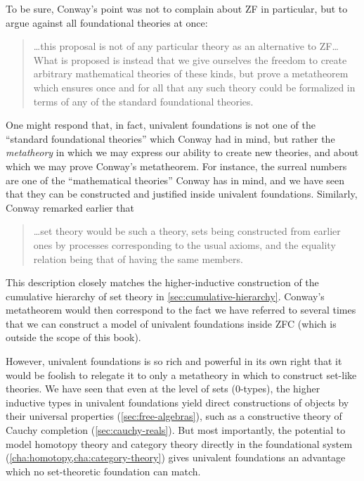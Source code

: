 To be sure, Conway's point was not to complain about ZF in particular, but to argue against all foundational theories at once:
\begin{quote}\footnotesize
  \dots this proposal is not of any particular theory as an alternative to ZF\dots{}
  What is proposed is instead that we give ourselves the freedom to create arbitrary mathematical theories of these kinds, but prove a metatheorem which ensures once and for all that any such theory could be formalized in terms of any of the standard foundational theories.
\end{quote}
One might respond that, in fact, univalent foundations is not one of the ``standard foundational theories'' which Conway had in mind, but rather the \emph{metatheory} in which we may express our ability to create new theories, and about which we may prove Conway's metatheorem.
For instance, the surreal numbers are one of the ``mathematical theories'' Conway has in mind, and we have seen that they can be constructed and justified inside univalent foundations.
Similarly, Conway remarked earlier that
\begin{quote}\footnotesize
  \dots set theory would be such a theory, sets being constructed from earlier ones by processes corresponding to the usual axioms, and the equality relation being that of having the same members.
\end{quote}
This description closely matches the higher-inductive construction of the cumulative hierarchy of set theory in \cref{sec:cumulative-hierarchy}.
Conway's metatheorem would then correspond to the fact we have referred to several times that we can construct a model of univalent foundations inside ZFC (which is outside the scope of this book).

However, univalent foundations is so rich and powerful in its own right that it would be foolish to relegate it to only a metatheory in which to construct set-like theories.
We have seen that even at the level of sets (0-types), the higher inductive types in univalent foundations yield direct constructions of objects by their universal properties (\cref{sec:free-algebras}), such as a constructive theory of Cauchy completion (\cref{sec:cauchy-reals}).
But most importantly, the potential to model homotopy theory and category theory directly in the foundational system (\cref{cha:homotopy,cha:category-theory}) gives univalent foundations an advantage which no set-theoretic foundation can match.
%

%

